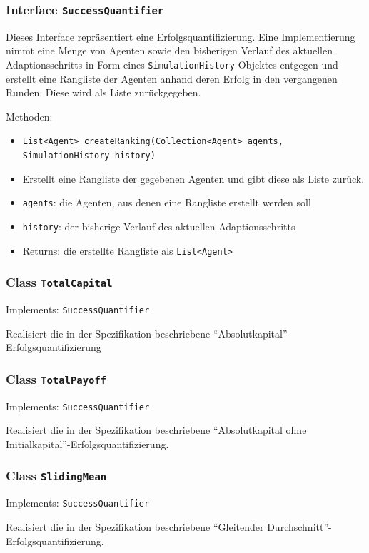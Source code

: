 \documentclass[parskip=full,11pt]{scrartcl}
\begin{document}
\subsubsection{Interface \texttt{SuccessQuantifier}}
Dieses Interface repräsentiert eine Erfolgsquantifizierung. Eine Implementierung nimmt eine Menge von Agenten sowie den bisherigen Verlauf des aktuellen Adaptionsschritts in Form eines \texttt{SimulationHistory}-Objektes entgegen und erstellt eine Rangliste der Agenten anhand deren Erfolg in den vergangenen Runden. Diese wird als Liste zurückgegeben.

Methoden:
\begin{itemize}\itemsep -10pt
\item \texttt{List<Agent> createRanking(Collection<Agent> agents, SimulationHistory history)}
\item[] Erstellt eine Rangliste der gegebenen Agenten und gibt diese als Liste zurück.
\item[] \texttt{agents}: die Agenten, aus denen eine Rangliste erstellt werden soll
\item[] \texttt{history}: der bisherige Verlauf des aktuellen Adaptionsschritts
\item[] Returns: die erstellte Rangliste als \texttt{List<Agent>}
\end{itemize}

\subsubsection{Class \texttt{TotalCapital}}
Implements: \texttt{SuccessQuantifier}

Realisiert die in der Spezifikation beschriebene \enquote{Absolutkapital}-Erfolgsquantifizierung

\subsubsection{Class \texttt{TotalPayoff}}
Implements: \texttt{SuccessQuantifier}

Realisiert die in der Spezifikation beschriebene \enquote{Absolutkapital ohne Initialkapital}-Erfolgsquantifizierung.

\subsubsection{Class \texttt{SlidingMean}}
Implements: \texttt{SuccessQuantifier}

Realisiert die in der Spezifikation beschriebene \enquote{Gleitender Durchschnitt}-Erfolgsquantifizierung.
\end{document}
